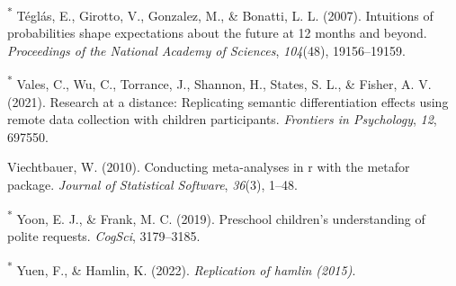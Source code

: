 \documentclass[
  man,floatsintext]{apa6}
\newlength{\cslhangindent}
\newlength{\cslentryspacingunit} %
\newenvironment{CSLReferences}[2] %
 {%
  \setlength{\parindent}{0pt}
  \ifodd #1
  \let\oldpar\par
  \def\par{\hangindent=\cslhangindent\oldpar}
  \fi
  \setlength{\parskip}{#2\cslentryspacingunit}
 }%
 {}
\begin{document}
\begin{CSLReferences}{1}{0}
\leavevmode{}%
\textsuperscript{*} Téglás, E., Girotto, V., Gonzalez, M., \& Bonatti, L. L. (2007). Intuitions of probabilities shape expectations about the future at 12 months and beyond. \emph{Proceedings of the National Academy of Sciences}, \emph{104}(48), 19156--19159.

\leavevmode{}%
\textsuperscript{*} Vales, C., Wu, C., Torrance, J., Shannon, H., States, S. L., \& Fisher, A. V. (2021). Research at a distance: Replicating semantic differentiation effects using remote data collection with children participants. \emph{Frontiers in Psychology}, \emph{12}, 697550.

\leavevmode{}%
Viechtbauer, W. (2010). Conducting meta-analyses in r with the metafor package. \emph{Journal of Statistical Software}, \emph{36}(3), 1--48.

\leavevmode{}%
\textsuperscript{*} Yoon, E. J., \& Frank, M. C. (2019). Preschool children's understanding of polite requests. \emph{CogSci}, 3179--3185.

\leavevmode{}%
\textsuperscript{*} Yuen, F., \& Hamlin, K. (2022). \emph{Replication of hamlin (2015)}.

\end{CSLReferences}
\end{document}
